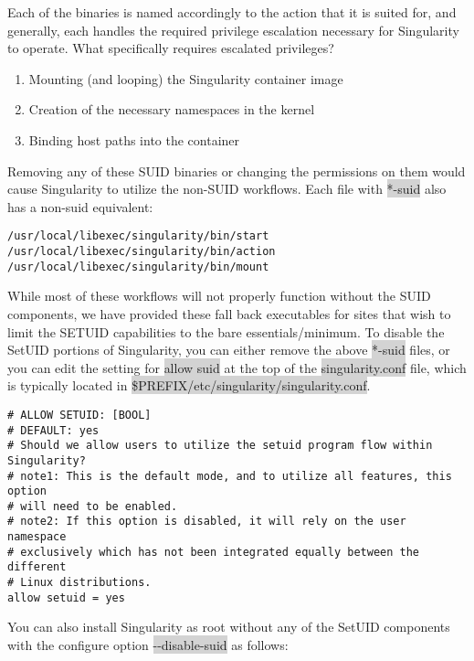 \documentclass[a4paper]{article}
\begin{document}
Each of the binaries is named accordingly to the action that it is suited for, and generally, each handles the required privilege escalation necessary for Singularity to operate. What specifically requires escalated privileges?\\[0.1in]

\begin{enumerate}
\item Mounting (and looping) the Singularity container image
\item Creation of the necessary namespaces in the kernel
\item Binding host paths into the container
\end{enumerate}


Removing any of these SUID binaries or changing the permissions on them would cause Singularity to utilize the non-SUID workflows. Each file with \colorbox{lightgray}{*-suid} also has a non-suid equivalent:

\begin{lstlisting}[frame=single]
/usr/local/libexec/singularity/bin/start
/usr/local/libexec/singularity/bin/action
/usr/local/libexec/singularity/bin/mount
\end{lstlisting}

While most of these workflows will not properly function without the SUID components, we have provided these fall back executables for sites that wish to limit the SETUID capabilities to the bare essentials/minimum. To disable the SetUID portions of Singularity, you can either remove the above \colorbox{lightgray}{*-suid} files, or you can edit the setting for \colorbox{lightgray}{allow suid} at the top of the \colorbox{lightgray}{singularity.conf} file, which is typically located in \colorbox{lightgray}{\$PREFIX/etc/singularity/singularity.conf}.\\[0.1in]

\begin{lstlisting}[frame=single]
# ALLOW SETUID: [BOOL]
# DEFAULT: yes
# Should we allow users to utilize the setuid program flow within Singularity?
# note1: This is the default mode, and to utilize all features, this option
# will need to be enabled.
# note2: If this option is disabled, it will rely on the user namespace
# exclusively which has not been integrated equally between the different
# Linux distributions.
allow setuid = yes
\end{lstlisting}


You can also install Singularity as root without any of the SetUID components with the configure option \colorbox{lightgray}{-{}-disable-suid} as follows:
\end{document}
